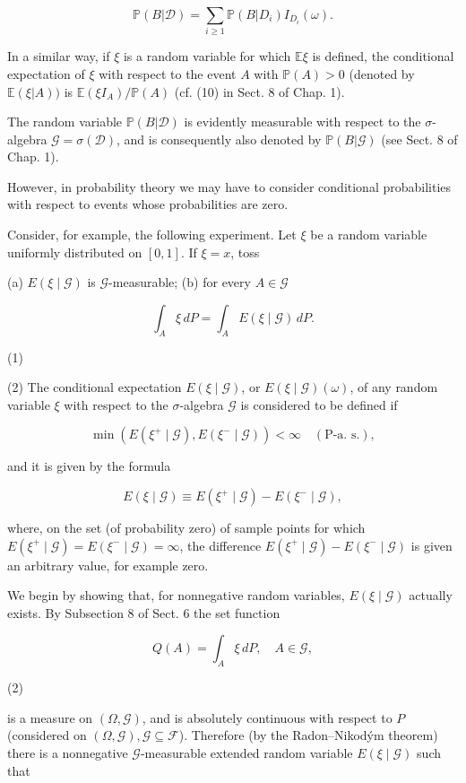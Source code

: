 $$\mathbb{P}(B|\mathcal{D}) = \sum_{i \geq 1} \mathbb{P}(B|D_i) I_{D_i}(\omega).$$

In a similar way, if $\xi$ is a random variable for which $\mathbb{E}\xi$ is defined, the conditional expectation of $\xi$ with respect to the event $A$ with $\mathbb{P}(A) > 0$ (denoted by $\mathbb{E}(\xi|A))$ is $\mathbb{E}(\xi I_A)/\mathbb{P}(A)$ (cf. (10) in Sect. 8 of Chap. 1).

The random variable $\mathbb{P}(B|\mathcal{D})$ is evidently measurable with respect to the $\sigma$-algebra $\mathcal{G} = \sigma(\mathcal{D})$, and is consequently also denoted by $\mathbb{P}(B|\mathcal{G})$ (see Sect. 8 of Chap. 1).

However, in probability theory we may have to consider conditional probabilities with respect to events whose probabilities are zero.

Consider, for example, the following experiment. Let $\xi$ be a random variable uniformly distributed on $[0, 1]$. If $\xi = x$, toss

(a) $E(\xi \mid \mathcal{G})$ is $\mathcal{G}$-measurable;
(b) for every $A \in \mathcal{G}$

$$\int_A \xi \, dP = \int_A E(\xi \mid \mathcal{G}) \, dP.$$  

(1)

(2) The conditional expectation $E(\xi \mid \mathcal{G})$, or $E(\xi \mid \mathcal{G})(\omega)$, of any random variable $\xi$ with respect to the $\sigma$-algebra $\mathcal{G}$ is considered to be defined if

$$\min(E(\xi^+ \mid \mathcal{G}), E(\xi^- \mid \mathcal{G})) < \infty \quad (\text{P-a. s.}),$$

and it is given by the formula

$$E(\xi \mid \mathcal{G}) \equiv E(\xi^+ \mid \mathcal{G}) - E(\xi^- \mid \mathcal{G}),$$

where, on the set (of probability zero) of sample points for which $E(\xi^+ \mid \mathcal{G}) = E(\xi^- \mid \mathcal{G}) = \infty$, the difference $E(\xi^+ \mid \mathcal{G}) - E(\xi^- \mid \mathcal{G})$ is given an arbitrary value, for example zero.

We begin by showing that, for nonnegative random variables, $E(\xi \mid \mathcal{G})$ actually exists. By Subsection 8 of Sect. 6 the set function

$$Q(A) = \int_A \xi \, dP, \quad A \in \mathcal{G},$$

(2)

is a measure on $(\Omega, \mathcal{G})$, and is absolutely continuous with respect to $P$ (considered on $(\Omega, \mathcal{G}), \mathcal{G} \subseteq \mathcal{F}$). Therefore (by the Radon–Nikodým theorem) there is a nonnegative $\mathcal{G}$-measurable extended random variable $E(\xi \mid \mathcal{G})$ such that

